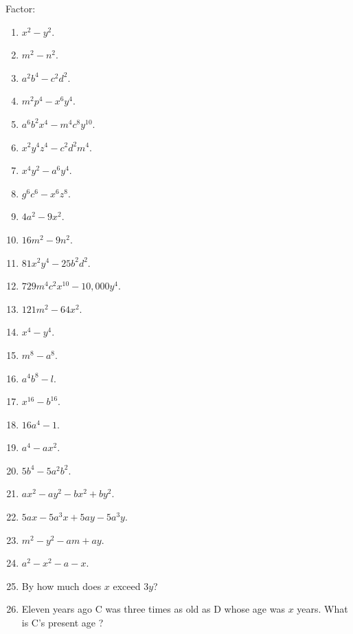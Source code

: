\documentclass{book}
\begin{document}
Factor:
\begin{enumerate}
\item $x^2-y^2$.

\item $m^2-n^2$.

\item $a^2b^4-c^2d^2$.

\item $m^2p^4-x^6y^4$.

\item $a^6b^2x^4-m^4c^8y^{10}$.

\item $x^2y^4z^4-c^2d^2m^4$.

\item $x^4y^2-a^6y^4$.

\item $g^6c^6-x^6z^8$.

\item $4a^2-9x^2$.

\item $16m^2-9n^2$.

\item $81x^2y^4-25b^2d^2$.

\item $729m^4c^2x^{10}-10,000y^4$.

\item $121m^2-64x^2$.

\item $x^4-y^4$.

\item $m^8 - a^8$.

\item $a^4b^8 - l$.

\item $x^16 - b^16$.

\item $16a^4 - 1$.

\item $a^4 - ax^2$.

\item $5b^4 - 5a^2b^2$.

\item $ax^2 - ay^2 - bx^2 + by^2$.

\item $5ax - 5a^3x + 5ay - 5a^3y$.

\item $m^2 - y^2 - am + ay$.

\item $a^2 - x^2 - a - x$.

\item By how much does $x$ exceed $3y$?

\item Eleven years ago C was three times as old as D whose age was
$x$ years. What is C's present age ?
\end{enumerate}
\end{document}
